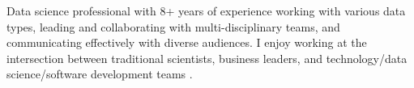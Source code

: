 %
%
%
\par{
Data science professional with 8+ years of experience working with various data types, leading and collaborating with multi-disciplinary teams, and communicating effectively with diverse audiences. I enjoy working at the intersection between traditional scientists, business leaders, and technology/data science/software development teams .
}